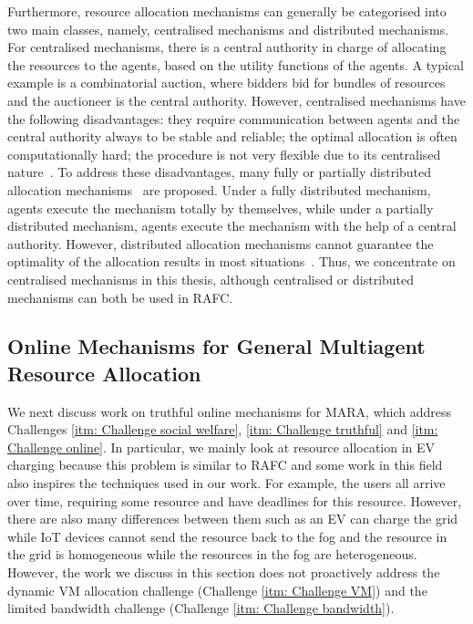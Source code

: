 \documentclass[11pt]{phdthesis}
\begin{document}
Furthermore, resource allocation mechanisms can generally be categorised into two main classes, namely, centralised mechanisms and distributed mechanisms. For centralised mechanisms, there is a central authority in charge of allocating the resources to the agents, based on the utility functions of the agents. A typical example is a combinatorial auction, where bidders bid for bundles of resources and the auctioneer is the central authority. However, centralised mechanisms have the following disadvantages: they require communication between agents and the central authority always to be stable and reliable; the optimal allocation is often computationally hard; the procedure is not very flexible due to its centralised nature~\citep{friedlander1982decentralized}.  To address these disadvantages, many fully or partially distributed allocation mechanisms~\citep{herreiner2002simple,bouveret2011general} are proposed. Under a fully distributed mechanism, agents execute the mechanism totally by themselves, while under a partially distributed mechanism, agents execute the mechanism with the help of a central authority. However, distributed allocation mechanisms cannot guarantee the optimality of the allocation results in most situations~\citep{rothe2015economics}. Thus, we concentrate on centralised mechanisms in this thesis, although centralised or distributed mechanisms can both be used in RAFC.


\subsection{Online Mechanisms for General Multiagent Resource Allocation}

We next discuss work on truthful online mechanisms for MARA, which address Challenges \ref{itm: Challenge social welfare}, \ref{itm: Challenge truthful} and \ref{itm: Challenge online}. In particular, we mainly look at resource allocation in EV charging because this problem is similar to RAFC and some work in this field also inspires the techniques used in our work. For example, the users all arrive over time, requiring some resource and have deadlines for this resource. However, there are also many differences between them such as an EV can charge the grid while IoT devices cannot send the resource back to the fog and the resource in the grid is homogeneous while the resources in the fog are heterogeneous. However, the work we discuss in this section does not proactively address the dynamic VM allocation challenge (Challenge \ref{itm: Challenge VM}) and the limited bandwidth challenge (Challenge \ref{itm: Challenge bandwidth}). 
\end{document}
